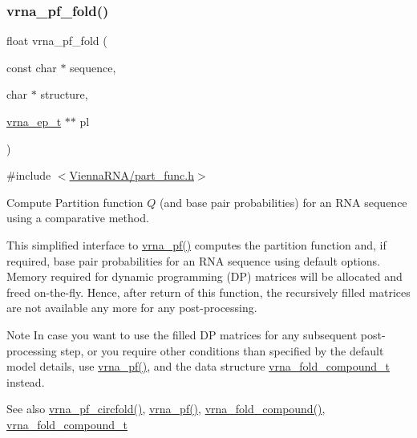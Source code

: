 \subsubsection{\texorpdfstring{vrna\+\_\+pf\+\_\+fold()}{vrna\_pf\_fold()}}
{\footnotesize\ttfamily float vrna\+\_\+pf\+\_\+fold (\begin{DoxyParamCaption}\item[{const char $\ast$}]{sequence,  }\item[{char $\ast$}]{structure,  }\item[{\hyperlink{group__struct__utils_gab9ac98ab55ded9fb90043b024b915aca}{vrna\+\_\+ep\+\_\+t} $\ast$$\ast$}]{pl }\end{DoxyParamCaption})}



{\ttfamily \#include $<$\hyperlink{part__func_8h}{Vienna\+R\+N\+A/part\+\_\+func.\+h}$>$}



Compute Partition function $Q$ (and base pair probabilities) for an R\+NA sequence using a comparative method. 

This simplified interface to \hyperlink{group__pf__fold_ga29e256d688ad221b78d37f427e0e99bc}{vrna\+\_\+pf()} computes the partition function and, if required, base pair probabilities for an R\+NA sequence using default options. Memory required for dynamic programming (DP) matrices will be allocated and free\textquotesingle{}d on-\/the-\/fly. Hence, after return of this function, the recursively filled matrices are not available any more for any post-\/processing.

\begin{DoxyNote}{Note}
In case you want to use the filled DP matrices for any subsequent post-\/processing step, or you require other conditions than specified by the default model details, use \hyperlink{group__pf__fold_ga29e256d688ad221b78d37f427e0e99bc}{vrna\+\_\+pf()}, and the data structure \hyperlink{group__fold__compound_ga1b0cef17fd40466cef5968eaeeff6166}{vrna\+\_\+fold\+\_\+compound\+\_\+t} instead.
\end{DoxyNote}
\begin{DoxySeeAlso}{See also}
\hyperlink{group__pf__fold_ga87e5a77b6e50dd54e9d032a9b92973be}{vrna\+\_\+pf\+\_\+circfold()}, \hyperlink{group__pf__fold_ga29e256d688ad221b78d37f427e0e99bc}{vrna\+\_\+pf()}, \hyperlink{group__fold__compound_ga6601d994ba32b11511b36f68b08403be}{vrna\+\_\+fold\+\_\+compound()}, \hyperlink{group__fold__compound_ga1b0cef17fd40466cef5968eaeeff6166}{vrna\+\_\+fold\+\_\+compound\+\_\+t}
\end{DoxySeeAlso}

